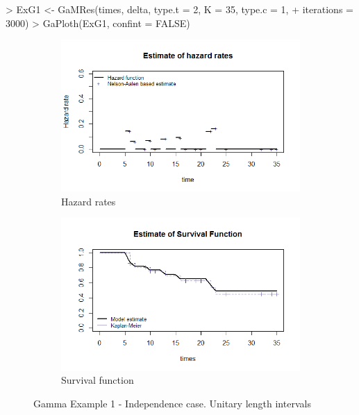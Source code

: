 \documentclass[letterpaper]{article}
\begin{document}
\begin{Schunk}
\begin{Sinput}
> ExG1 <- GaMRes(times, delta, type.t = 2, K = 35, type.c = 1, 
+                iterations = 3000)
> GaPloth(ExG1, confint = FALSE)
\end{Sinput}
\end{Schunk}
\begin{figure}
  \centering
  \begin{subfigure}[a]{\textwidth}\centering
    \includegraphics[width=\textwidth]{G11.png}
    \caption{Hazard rates}
  \end{subfigure}
  \begin{subfigure}[b]{\textwidth}\centering
    \includegraphics[width=\textwidth]{G12.png}
    \caption{Survival function}
  \end{subfigure}
  \caption{Gamma Example 1 - Independence case. Unitary length intervals}
  \label{fig:G1}
\end{figure}
\end{document}
